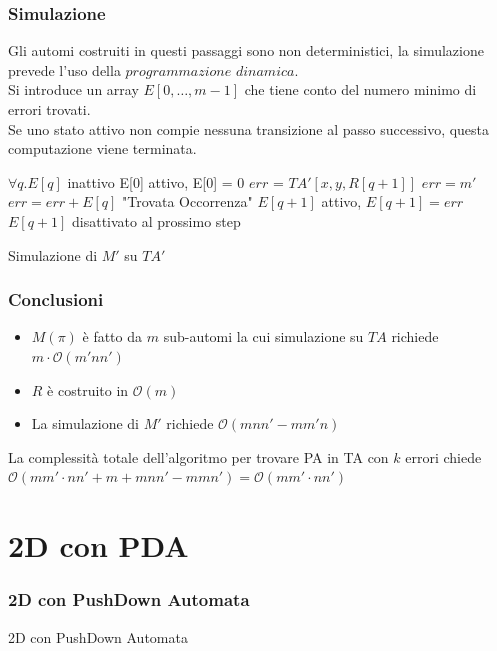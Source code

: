\documentclass{beamer}
\newcommand{\bigO}{\ensuremath{\mathcal{O}}} %
\begin{document}
\begin{frame}
\frametitle{Simulazione}
Gli automi costruiti in questi passaggi sono non deterministici, la simulazione prevede l'uso della $programmazione$ $dinamica$.\\
Si introduce un array $E[0,\dots, m-1]$ che tiene conto del numero minimo di errori trovati.\\
Se uno stato attivo non compie nessuna transizione al passo successivo, questa computazione viene terminata.
\end{frame}


\begin{frame}

\begin{algorithm}[H]
\begin{algorithmic}[1]
  \scriptsize
{}
\STATE $\forall q . E[q]$ inattivo
		\STATE E[0] attivo, E[0] = 0
			\STATE $err$ = $TA'[x,y,R[q+1]]$
			 \STATE $err = m'$ \ENDIF
			\STATE $err = err + E[q]$
				 \STATE "Trovata Occorrenza"
				\ELSE \STATE $E[q+1]$ attivo, $E[q+1] = err$
				\ENDIF
			\ELSE \STATE $E[q+1]$ disattivato al prossimo step
			\ENDIF
		\ENDFOR
	\ENDFOR
\ENDFOR


\end{algorithmic}
\caption{Simulazione di $M'$ su $TA'$}
\end{algorithm}

\end{frame}

\begin{frame}
\frametitle{Conclusioni}

\begin{itemize}
\item $M(\pi)$ è fatto da $m$ sub-automi la cui simulazione su $TA$ richiede $m \cdot \bigO{(m'nn')}$
\item $R$ è costruito in $\bigO{(m)}$ 
\item La simulazione di $M'$ richiede $\bigO{(mnn' - mm'n)}$
\end{itemize}
La complessità totale dell'algoritmo per trovare PA in TA con $k$ errori chiede $\bigO{(mm' \cdot nn' + m +mnn' - mmn')} = \bigO{(mm' \cdot nn')}$

\end{frame}

\section{2D con PDA}
\begin{frame}
\frametitle{2D con PushDown Automata}
\Huge{\centerline{2D con PushDown Automata}}
\end{frame}
\end{document}
